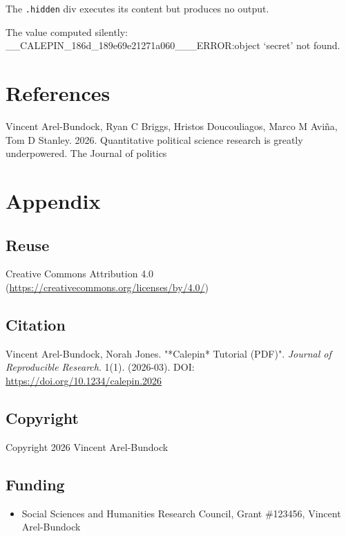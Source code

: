 \documentclass[11pt]{article}
\begin{document}
The \texttt{.hidden} div executes its content but produces no output.


The value computed silently: \_\_CALEPIN\_186d\_189e69e21271a060\_\_\_ERROR:object `secret' not found.



\section*{References}
\label{references}

Vincent Arel-Bundock, Ryan C Briggs, Hristos Doucouliagos, Marco M Aviña, Tom D Stanley. 2026. Quantitative political science research is greatly underpowered. The Journal of politics



\appendix
\section*{Appendix}
\subsection*{Reuse}
Creative Commons Attribution 4.0 (\url{https://creativecommons.org/licenses/by/4.0/})
\subsection*{Citation}
Vincent Arel-Bundock, Norah Jones. "*Calepin* Tutorial (PDF)". \emph{Journal of Reproducible Research}. 1(1). (2026-03). DOI: \url{https://doi.org/10.1234/calepin.2026}
\subsection*{Copyright}
Copyright 2026 Vincent Arel-Bundock
\subsection*{Funding}
\begin{itemize}
\item Social Sciences and Humanities Research Council, Grant \#123456, Vincent Arel-Bundock
\end{itemize}
\end{document}
